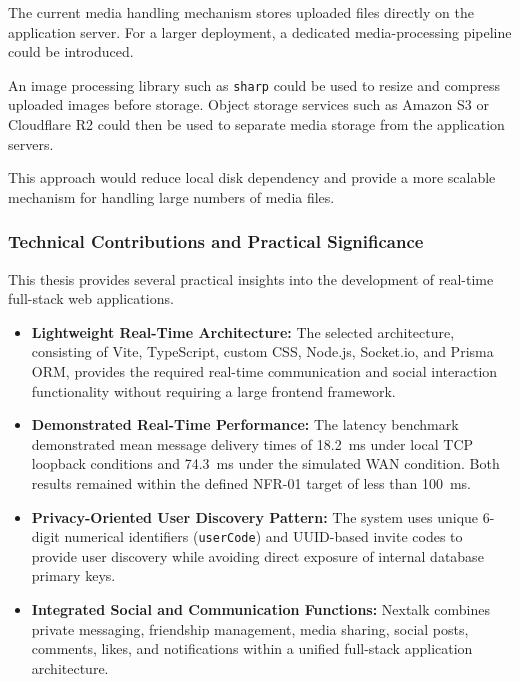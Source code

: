 \documentclass[12pt, a4paper]{article}
\begin{document}
The current media handling mechanism stores uploaded files directly on the application server. For a larger deployment, a dedicated media-processing pipeline could be introduced.

An image processing library such as \texttt{sharp} could be used to resize and compress uploaded images before storage. Object storage services such as Amazon S3 or Cloudflare R2 could then be used to separate media storage from the application servers.

This approach would reduce local disk dependency and provide a more scalable mechanism for handling large numbers of media files.

\subsubsection{Technical Contributions and Practical Significance}

This thesis provides several practical insights into the development of real-time full-stack web applications.

\begin{itemize}

    \item
    \textbf{Lightweight Real-Time Architecture:}
    The selected architecture, consisting of Vite, TypeScript, custom CSS, Node.js, Socket.io, and Prisma ORM, provides the required real-time communication and social interaction functionality without requiring a large frontend framework.

    \item
    \textbf{Demonstrated Real-Time Performance:}
    The latency benchmark demonstrated mean message delivery times of 18.2~ms under local TCP loopback conditions and 74.3~ms under the simulated WAN condition. Both results remained within the defined NFR-01 target of less than 100~ms.

    \item
    \textbf{Privacy-Oriented User Discovery Pattern:}
    The system uses unique 6-digit numerical identifiers (\texttt{userCode}) and UUID-based invite codes to provide user discovery while avoiding direct exposure of internal database primary keys.

    \item
    \textbf{Integrated Social and Communication Functions:}
    Nextalk combines private messaging, friendship management, media sharing, social posts, comments, likes, and notifications within a unified full-stack application architecture.

\end{itemize}
\end{document}
